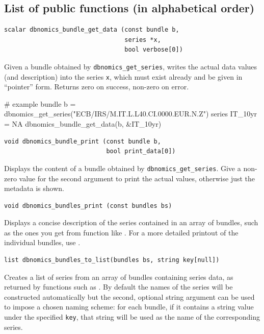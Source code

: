 \documentclass{article}
\begin{document}
\subsection{List of public functions (in alphabetical order)}

\begin{funcdoc}
\begin{verbatim}
scalar dbnomics_bundle_get_data (const bundle b,
                                 series *x,
                                 bool verbose[0])
\end{verbatim}
Given a bundle obtained by \texttt{dbnomics\_get\_series}, writes the
actual data values (and description) into the series \texttt{x}, which
must exist already and be given in ``pointer'' form. Returns zero on
success, non-zero on error.
\begin{code}
# example
bundle b = dbnomics_get_series("ECB/IRS/M.IT.L.L40.CI.0000.EUR.N.Z")
series IT_10yr = NA
dbnomics_bundle_get_data(b, &IT_10yr)
\end{code}
\end{funcdoc}

\begin{funcdoc}
\begin{verbatim}
void dbnomics_bundle_print (const bundle b,
                            bool print_data[0])
\end{verbatim}
Displays the content of a bundle obtained by
\texttt{dbnomics\_get\_series}. Give a non-zero value for the second
argument to print the actual values, otherwise just the metadata is
shown.
\end{funcdoc}

\begin{funcdoc}
\begin{verbatim}
void dbnomics_bundles_print (const bundles bs)
\end{verbatim}
Displays a concise description of the series contained in an array of
bundles, such as the ones you get from function like
. For a more detailed printout of the
individual bundles, use .
\end{funcdoc}

\begin{funcdoc}
\begin{verbatim}
list dbnomics_bundles_to_list(bundles bs, string key[null])
\end{verbatim}
  Creates a list of series from an array of bundles containing series
  data, as returned by functions such as
  . By default the names of the series
  will be constructed automatically but the second, optional string
  argument can be used to impose a chosen naming scheme: for each
  bundle, if it contains a string value under the specified
  \texttt{key}, that string will be used as the name of the
  corresponding series.
\end{funcdoc}
\end{document}
